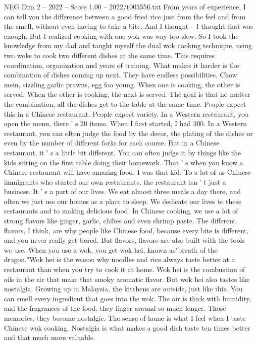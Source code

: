 \begin{textsample}{NEG Dim 2 – 2022 – Score 1.00 – 2022/t003556.txt}
From years of experience, I can tell you the difference between a good fried rice just from the feel and from the smell, without even having to take a bite.
And I thought -- I thought that was enough.
But I realized cooking with one wok was way too slow.
So I took the knowledge from my dad and taught myself the dual wok cooking technique, using two woks to cook two different dishes at the same time.
This requires coordination, organization and years of training.
What makes it harder is the combination of dishes coming up next.
They have endless possibilities.
Chow mein, sizzling garlic prawns, egg foo young.
When one is cooking, the other is served.
When the other is cooking, the next is served.
The goal is that no matter the combination, all the dishes get to the table at the same time.
People expect this in a Chinese restaurant.
People expect variety.
In a Western restaurant, you open the menu, there ' s 20 items.
When I first started, I had 300.
In a Western restaurant, you can often judge the food by the decor, the plating of the dishes or even by the number of different forks for each course.
But in a Chinese restaurant, it ' s a little bit different.
You can often judge it by things like the kids sitting on the first table doing their homework.
That ' s when you know a Chinese restaurant will have amazing food.
I was that kid.
To a lot of us Chinese immigrants who started our own restaurants, the restaurant isn ' t just a business.
It ' s a part of our lives.
We eat almost three meals a day there, and often we just use our homes as a place to sleep.
We dedicate our lives to these restaurants and to making delicious food.
In Chinese cooking, we use a lot of strong flavors like ginger, garlic, chilies and even shrimp paste.
The different flavors, I think, are why people like Chinese food, because every bite is different, and you never really get bored.
But flavors, flavors are also built with the tools we use.
When you use a wok, you get wok hei, known as"breath of the dragon."Wok hei is the reason why noodles and rice always taste better at a restaurant than when you try to cook it at home.
Wok hei is the combustion of oils in the air that make that smoky aromatic flavor.
But wok hei also tastes like nostalgia.
Growing up in Malaysia, the kitchens are outside, just like this.
You can smell every ingredient that goes into the wok.
The air is thick with humidity, and the fragrances of the food, they linger around so much longer.
Those memories, they become nostalgic.
The sense of home is what I feel when I taste Chinese wok cooking.
Nostalgia is what makes a good dish taste ten times better and that much more valuable.

\end{textsample}
